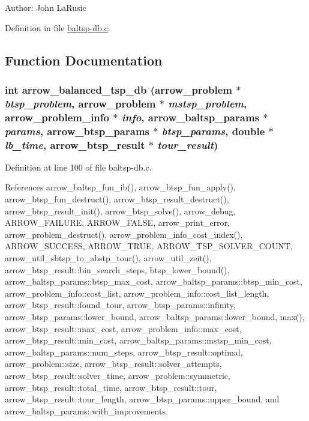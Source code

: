 \begin{Desc}
\item[Author:]John LaRusic \end{Desc}


Definition in file \hyperlink{lib_2baltsp_2baltsp-db_8c-source}{baltsp-db.c}.

\subsection{Function Documentation}
\hypertarget{lib_2baltsp_2baltsp-db_8c_1d70c3ec49bdea00ae8f19b56a441ed4}{
\subsubsection[{arrow\_\-balanced\_\-tsp\_\-db}]{\setlength{\rightskip}{0pt plus 5cm}int arrow\_\-balanced\_\-tsp\_\-db ({\bf arrow\_\-problem} $\ast$ {\em btsp\_\-problem}, \/  {\bf arrow\_\-problem} $\ast$ {\em mstsp\_\-problem}, \/  {\bf arrow\_\-problem\_\-info} $\ast$ {\em info}, \/  {\bf arrow\_\-baltsp\_\-params} $\ast$ {\em params}, \/  {\bf arrow\_\-btsp\_\-params} $\ast$ {\em btsp\_\-params}, \/  double $\ast$ {\em lb\_\-time}, \/  {\bf arrow\_\-btsp\_\-result} $\ast$ {\em tour\_\-result})}}
\label{lib_2baltsp_2baltsp-db_8c_1d70c3ec49bdea00ae8f19b56a441ed4}




Definition at line 100 of file baltsp-db.c.

References arrow\_\-baltsp\_\-fun\_\-ib(), arrow\_\-btsp\_\-fun\_\-apply(), arrow\_\-btsp\_\-fun\_\-destruct(), arrow\_\-btsp\_\-result\_\-destruct(), arrow\_\-btsp\_\-result\_\-init(), arrow\_\-btsp\_\-solve(), arrow\_\-debug, ARROW\_\-FAILURE, ARROW\_\-FALSE, arrow\_\-print\_\-error, arrow\_\-problem\_\-destruct(), arrow\_\-problem\_\-info\_\-cost\_\-index(), ARROW\_\-SUCCESS, ARROW\_\-TRUE, ARROW\_\-TSP\_\-SOLVER\_\-COUNT, arrow\_\-util\_\-sbtsp\_\-to\_\-abstp\_\-tour(), arrow\_\-util\_\-zeit(), arrow\_\-btsp\_\-result::bin\_\-search\_\-steps, btsp\_\-lower\_\-bound(), arrow\_\-baltsp\_\-params::btsp\_\-max\_\-cost, arrow\_\-baltsp\_\-params::btsp\_\-min\_\-cost, arrow\_\-problem\_\-info::cost\_\-list, arrow\_\-problem\_\-info::cost\_\-list\_\-length, arrow\_\-btsp\_\-result::found\_\-tour, arrow\_\-btsp\_\-params::infinity, arrow\_\-btsp\_\-params::lower\_\-bound, arrow\_\-baltsp\_\-params::lower\_\-bound, max(), arrow\_\-btsp\_\-result::max\_\-cost, arrow\_\-problem\_\-info::max\_\-cost, arrow\_\-btsp\_\-result::min\_\-cost, arrow\_\-baltsp\_\-params::mstsp\_\-min\_\-cost, arrow\_\-baltsp\_\-params::num\_\-steps, arrow\_\-btsp\_\-result::optimal, arrow\_\-problem::size, arrow\_\-btsp\_\-result::solver\_\-attempts, arrow\_\-btsp\_\-result::solver\_\-time, arrow\_\-problem::symmetric, arrow\_\-btsp\_\-result::total\_\-time, arrow\_\-btsp\_\-result::tour, arrow\_\-btsp\_\-result::tour\_\-length, arrow\_\-btsp\_\-params::upper\_\-bound, and arrow\_\-baltsp\_\-params::with\_\-improvements.

